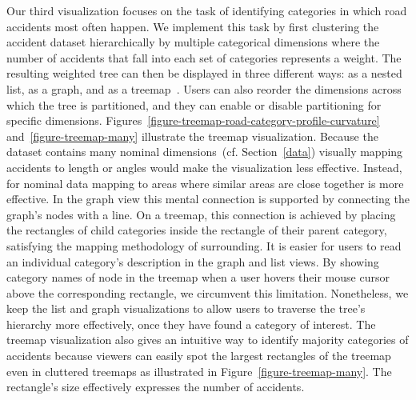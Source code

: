 Our third visualization focuses on the task of identifying categories in which road accidents most often happen. We implement this task by first clustering the accident dataset hierarchically by multiple categorical dimensions where the number of accidents that fall into each set of categories represents a weight. The resulting weighted tree can then be displayed in three different ways: \Ni as a nested list, \Nii as a graph, and \Niii as a treemap~\cite{Shneiderman1992}.
Users can also reorder the dimensions across which the tree is partitioned, and they can enable or disable partitioning for specific dimensions.
Figures~\ref{figure-treemap-road-category-profile-curvature} and~\ref{figure-treemap-many} illustrate the treemap visualization.
Because the dataset contains many nominal dimensions~(cf. Section~\ref{data}) visually mapping accidents to length or angles would make the visualization less effective. Instead, for nominal data mapping to areas where similar areas are close together is more effective.
In the graph view this mental connection is supported by connecting the graph's nodes with a line. On a treemap, this connection is achieved by placing the rectangles of child categories inside the rectangle of their parent category, satisfying the mapping methodology of surrounding.
It is easier for users to read an individual category's description in the graph and list views. By showing category names of node in the treemap when a user hovers their mouse cursor above the corresponding rectangle, we circumvent this limitation.
Nonetheless, we keep the list and graph visualizations to allow users to traverse the tree's hierarchy more effectively, once they have found a category of interest.
The treemap visualization also gives an intuitive way to identify majority categories of accidents because viewers can easily spot the largest rectangles of the treemap even in cluttered treemaps as illustrated in Figure~\ref{figure-treemap-many}. The rectangle's size effectively expresses the number of accidents.

